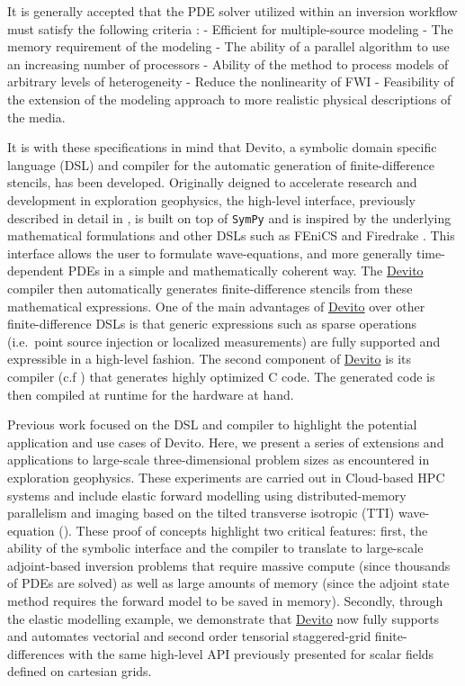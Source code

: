 \documentclass[conference]{IEEEtran}
\begin{document}
It is generally accepted that the PDE solver utilized within an
inversion workflow must satisfy the following criteria
\cite{virieuxmodelling}: - Efficient for multiple-source modeling - The
memory requirement of the modeling - The ability of a parallel algorithm
to use an increasing number of processors - Ability of the method to
process models of arbitrary levels of heterogeneity - Reduce the
nonlinearity of FWI - Feasibility of the extension of the modeling
approach to more realistic physical descriptions of the media.

It is with these specifications in mind that Devito, a symbolic domain
specific language (DSL) and compiler for the automatic generation of
finite-difference stencils, has been developed. Originally deigned to
accelerate research and development in exploration geophysics, the
high-level interface, previously described in detail in \cite{devito-api},
is built on top of \texttt{SymPy} \cite{sympy} and is inspired by the
underlying mathematical formulations and other DSLs such as FEniCS
\cite{fenics} and Firedrake \cite{firedrake}. This interface allows the
user to formulate wave-equations, and more generally time-dependent PDEs
in a simple and mathematically coherent way. The \href{https://github.com/devitocodes/devito}{Devito} compiler then
automatically generates finite-difference stencils from these mathematical
expressions. One of the main advantages of \href{https://github.com/devitocodes/devito}{Devito} over other
finite-difference DSLs is that generic expressions such as sparse
operations (i.e.~point source injection or localized measurements) are
fully supported and expressible in a high-level fashion. The second
component of \href{https://github.com/devitocodes/devito}{Devito} is its compiler (c.f \cite{devito-compiler}) that
generates highly optimized C code. The generated code is then compiled at
runtime for the hardware at hand.

Previous work focused on the DSL and compiler to highlight the potential
application and use cases of Devito. Here, we present a series of
extensions and applications to large-scale three-dimensional problem sizes
as encountered in exploration geophysics. These experiments are carried
out in Cloud-based HPC systems and include elastic forward modelling using
distributed-memory parallelism and imaging based on the tilted transverse
isotropic (TTI) wave-equation (\cite{virieux, thomsen1986, zhang-tti,
duveneck, louboutin2018segeow}).  These proof of concepts highlight two
critical features: first, the ability of the symbolic interface and the
compiler to translate to large-scale adjoint-based inversion problems that
require massive compute (since thousands of PDEs are solved) as well as
large amounts of memory (since the adjoint state method requires the
forward model to be saved in memory). Secondly, through the elastic
modelling example, we demonstrate that \href{https://github.com/devitocodes/devito}{Devito} now fully supports and
automates vectorial and second order tensorial staggered-grid
finite-differences with the same high-level API previously presented for
scalar fields defined on cartesian grids.
\end{document}
